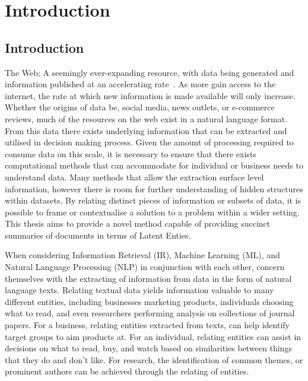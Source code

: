 \documentclass[10pt]{report}
\begin{document}
\renewcommand{\baselinestretch}{0.5}\normalsize
\tableofcontents
\listoffigures
\listoftables
\renewcommand{\baselinestretch}{2.0}\normalsize

%
%
%
%
\chapter{Introduction}

\section{Introduction}
The Web; A seemingly ever-expanding resource, with data being generated and information published at an accelerating rate~\cite{WebServer-lc}. As more gain access to the internet, the rate at which new information is made available will only increase. Whether the origins of data be, social media, news outlets, or e-commerce reviews, much of the resources on the web exist in a natural language format. From this data there exists underlying information that can be extracted and utilised in decision making process. Given the amount of processing required to consume data on this scale, it is necessary to ensure that there exists computational methods that can accommodate for individual or business needs to understand data. Many methods that allow the extraction surface level information, however there is room for further understanding of hidden structures within datasets. By relating distinct pieces of information or subsets of data, it is possible to frame or contextualise a solution to a problem within a wider setting. This thesis aims to provide a novel method capable of providing succinct summaries of documents in terms of Latent Enties.

When considering Information Retrieval (IR), Machine Learning (ML), and Natural Language Processing (NLP) in conjunction with each other, concern themselves with the extracting of information from data in the form of natural language texts. Relating textual data yields information valuable to many different entities, including businesses marketing products, individuals choosing what to read, and even researchers performing analysis on collections of journal papers. For a business, relating entities extracted from texts, can help identify target groups to aim products at. For an individual, relating entities can assist in decisions on what to read, buy, and watch based on similarities between things that they do and don’t like. For research, the identification of common themes, or prominent authors can be achieved through the relating of entities.
\end{document}
